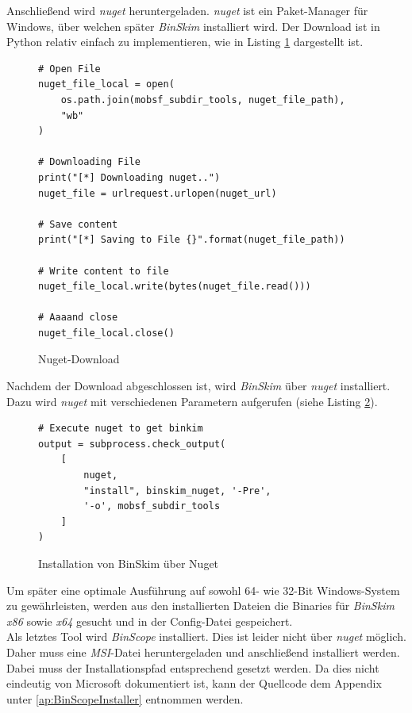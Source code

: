 Anschließend wird \textit{nuget} heruntergeladen. \textit{nuget} ist ein Paket-Manager für Windows, über welchen später \textit{BinSkim} installiert wird. Der Download ist in Python relativ einfach zu implementieren, wie in Listing \ref{lst:WeitNugetDown} dargestellt ist.\\

\begin{figure}
\begin{lstlisting}
# Open File
nuget_file_local = open(
	os.path.join(mobsf_subdir_tools, nuget_file_path), 
	"wb"
)

# Downloading File
print("[*] Downloading nuget..")
nuget_file = urlrequest.urlopen(nuget_url)

# Save content
print("[*] Saving to File {}".format(nuget_file_path))

# Write content to file
nuget_file_local.write(bytes(nuget_file.read()))

# Aaaand close
nuget_file_local.close()
\end{lstlisting}
\caption{Nuget-Download}
\label{lst:WeitNugetDown}
\end{figure}

Nachdem der Download abgeschlossen ist, wird \textit{BinSkim} über \textit{nuget} installiert. Dazu wird \textit{nuget} mit verschiedenen Parametern aufgerufen (siehe Listing \ref{lst:WeitNugetInst}).\\

\begin{figure}
\begin{lstlisting}
# Execute nuget to get binkim
output = subprocess.check_output(
    [
        nuget,
        "install", binskim_nuget, '-Pre',
        '-o', mobsf_subdir_tools
    ]
)
\end{lstlisting}
\caption{Installation von BinSkim über Nuget}
\label{lst:WeitNugetInst}
\end{figure}

Um später eine optimale Ausführung auf sowohl 64- wie 32-Bit Windows-System zu gewährleisten, werden aus den installierten Dateien die Binaries für \textit{BinSkim} \textit{x86} sowie \textit{x64} gesucht und in der Config-Datei gespeichert.\\

Als letztes Tool wird \textit{BinScope} installiert. Dies ist leider nicht über \textit{nuget} möglich. Daher muss eine \textit{MSI}-Datei heruntergeladen und anschließend installiert werden. Dabei muss der Installationspfad entsprechend gesetzt werden. Da dies nicht eindeutig von Microsoft dokumentiert ist, kann der Quellcode dem Appendix unter \ref{ap:BinScopeInstaller} entnommen werden.\\

